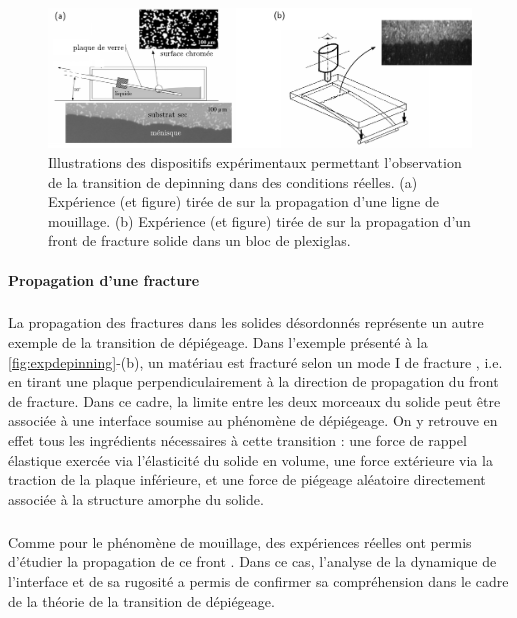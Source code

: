 \begin{figure}[h]
	\centering
	\includegraphics[width=\textwidth]{Chapitre1/Figures/Depinning/expdepinning.pdf}
	\caption{Illustrations des dispositifs expérimentaux permettant l'observation de la transition de depinning dans des conditions réelles. (a) Expérience (et figure) tirée de \cite{moulinet_roughness_2002} sur la propagation d'une ligne de mouillage. (b) Expérience (et figure) tirée de \cite{schmittbuhl_direct_1997} sur la propagation d'un front de fracture solide dans un bloc de plexiglas.}
	\label{fig:expdepinning}
\end{figure}

\paragraph{Propagation d'une fracture}

\subparagraph{}La propagation des fractures dans les solides désordonnés représente un autre exemple de la transition de dépiégeage. Dans l'exemple présenté à la \autoref{fig:expdepinning}-(b), un matériau est fracturé selon un mode I de fracture \cite{le_priol_long_range_2020}, i.e. en tirant une plaque perpendiculairement à la direction de propagation du front de fracture. Dans ce cadre, la limite entre les deux morceaux du solide peut être associée à une interface soumise au phénomène de dépiégeage. On y retrouve en effet tous les ingrédients nécessaires à cette transition : une force de rappel élastique exercée via l'élasticité du solide en volume, une force extérieure via la traction de la plaque inférieure, et une force de piégeage aléatoire directement associée à la structure amorphe du solide.

\subparagraph{}Comme pour le phénomène de mouillage, des expériences réelles ont permis d'étudier la propagation de ce front \cite{schmittbuhl_direct_1997, delaplace_high_1999, santucci_fracture_2010, le_priol_universal_2020}. Dans ce cas, l'analyse de la dynamique de l'interface et de sa rugosité a permis de confirmer sa compréhension dans le cadre de la théorie de la transition de dépiégeage.

